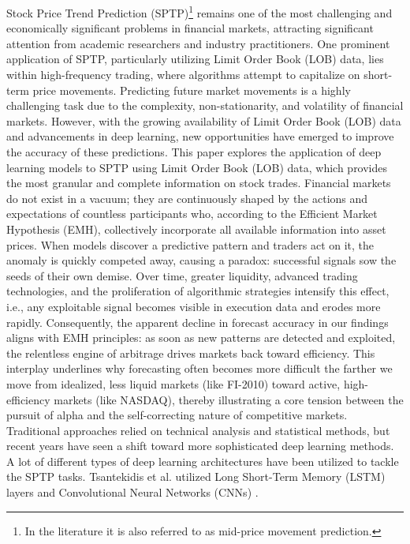 Stock Price Trend Prediction (SPTP)\footnote{In the literature it is also referred to as mid-price movement prediction.} remains one of the most challenging and economically significant problems in financial markets, attracting significant attention from academic researchers and industry practitioners. One prominent application of SPTP, particularly utilizing Limit Order Book (LOB) data, lies within high-frequency trading, where algorithms attempt to capitalize on short-term price movements. Predicting future market movements is a highly challenging task due to the complexity, non-stationarity, and volatility of financial markets. However, with the growing availability of Limit Order Book (LOB) data and advancements in deep learning, new opportunities have emerged to improve the accuracy of these predictions. This paper explores the application of deep learning models to SPTP using Limit Order Book (LOB) data, which provides the most granular and complete information on stock trades.
Financial markets do not exist in a vacuum; they are continuously shaped by the actions and expectations of countless participants who, according to the Efficient Market Hypothesis (EMH), collectively incorporate all available information into asset prices. When models discover a predictive pattern and traders act on it, the anomaly is quickly competed away, causing a paradox: successful signals sow the seeds of their own demise. Over time, greater liquidity, advanced trading technologies, and the proliferation of algorithmic strategies intensify this effect, i.e., any exploitable signal becomes visible in execution data and erodes more rapidly. Consequently, the apparent decline in forecast accuracy in our findings aligns with EMH principles: as soon as new patterns are detected and exploited, the relentless engine of arbitrage drives markets back toward efficiency. This interplay underlines why forecasting often becomes more difficult the farther we move from idealized, less liquid markets (like FI-2010) toward active, high-efficiency markets (like NASDAQ), thereby illustrating a core tension between the pursuit of alpha and the self-correcting nature of competitive markets.
Traditional approaches relied on technical analysis and statistical methods, but recent years have seen a shift toward more sophisticated deep learning methods.
A lot of different types of deep learning architectures have been utilized to tackle the SPTP tasks. Tsantekidis et al. utilized Long Short-Term Memory (LSTM) layers \cite{tsantekidis2017forecasting} and Convolutional Neural Networks (CNNs) \cite{tsantekidis2017using, tsantekidis2020using}. 
